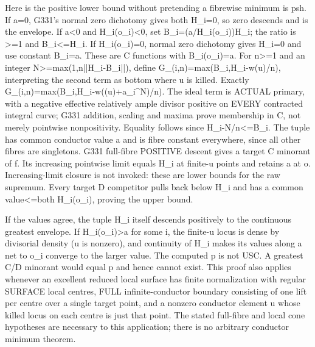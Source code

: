\documentclass[11pt]{article}
\begin{document}
Here is the positive lower bound without pretending a fibrewise minimum is psh. If a=0, G331's normal zero dichotomy gives both H\_i=0, so zero descends and is the envelope. If a\textless{}0 and H\_i(o\_i)\textless{}0, set B\_i=(a/H\_i(o\_i))H\_i; the ratio is \textgreater{}=1 and B\_i\textless{}=H\_i. If H\_i(o\_i)=0, normal zero dichotomy gives H\_i=0 and use constant B\_i=a. These are C functions with B\_i(o\_i)=a. For n\textgreater{}=1 and an integer N\textgreater{}=max(1,n||H\_i-B\_i||), define
G\_(i,n)=max(B\_i,H\_i-w(u)/n), interpreting the second term as bottom where u is killed.
Exactly G\_(i,n)=max(B\_i,H\_i-w((u)+a\_i\textasciicircum{}N)/n). The ideal term is ACTUAL primary, with a negative effective relatively ample divisor positive on EVERY contracted integral curve; G331 addition, scaling and maxima prove membership in C, not merely pointwise nonpositivity. Equality follows since H\_i-N/n\textless{}=B\_i. The tuple has common conductor value a and is fibre constant everywhere, since all other fibres are singletons. G331 full-fibre POSITIVE descent gives a target C minorant of f. Its increasing pointwise limit equals H\_i at finite-u points and retains a at o. Increasing-limit closure is not invoked: these are lower bounds for the raw supremum. Every target D competitor pulls back below H\_i and has a common value\textless{}=both H\_i(o\_i), proving the upper bound.

If the values agree, the tuple H\_i itself descends positively to the continuous greatest envelope. If H\_i(o\_i)\textgreater{}a for some i, the finite-u locus is dense by divisorial density (u is nonzero), and continuity of H\_i makes its values along a net to o\_i converge to the larger value. The computed p is not USC. A greatest C/D minorant would equal p and hence cannot exist. This proof also applies whenever an excellent reduced local surface has finite normalization with regular SURFACE local centres, FULL infinite-conductor boundary consisting of one lift per centre over a single target point, and a nonzero conductor element u whose killed locus on each centre is just that point. The stated full-fibre and local cone hypotheses are necessary to this application; there is no arbitrary conductor minimum theorem.
\end{document}
